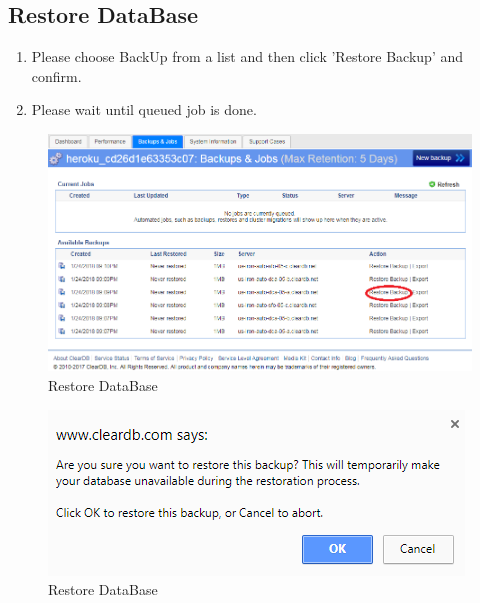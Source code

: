 \documentclass[a4paper,11pt,twoside]{report}
\theoremstyle{definition}
\begin{document}
\subsection{Restore DataBase} 
\begin{enumerate}
\item Please choose BackUp from a list and then click 'Restore Backup' and confirm.
\item Please wait until queued job is done.
\end{enumerate}
\begin{figure}[h!]
\begin{center}
\includegraphics[width=\textwidth]{DB/9}
\end{center}
\caption{Restore DataBase}
\end{figure}
\thispagestyle{empty}
\begin{figure}[h!]
\begin{center}
\includegraphics[scale = 1]{DB/10}
\end{center}
\caption{Restore DataBase}
\end{figure}
\thispagestyle{empty}
\end{document}
